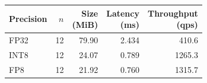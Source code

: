 \begin{tabular}{lrrrr}
\toprule
Precision & $n$ & \shortstack{Size\\(MiB)} & \shortstack{Latency\\(ms)} & \shortstack{Throughput\\(qps)} \\
\midrule
FP32 & 12 & 79.90 & 2.434 & 410.6 \\
INT8 & 12 & 24.07 & 0.789 & 1265.3 \\
FP8 & 12 & 21.92 & 0.760 & 1315.7 \\
\bottomrule
\end{tabular}
